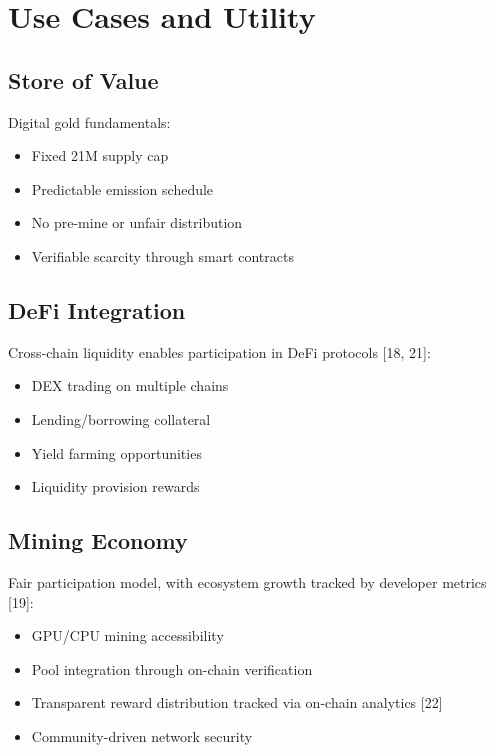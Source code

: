 \documentclass[11pt,a4paper]{article}
\begin{document}
\section{Use Cases and Utility}

\subsection{Store of Value}

Digital gold fundamentals:
\begin{itemize}
    \item Fixed 21M supply cap
    \item Predictable emission schedule
    \item No pre-mine or unfair distribution
    \item Verifiable scarcity through smart contracts
\end{itemize}

\subsection{DeFi Integration}

Cross-chain liquidity enables participation in DeFi protocols [18, 21]:
\begin{itemize}
    \item DEX trading on multiple chains
    \item Lending/borrowing collateral
    \item Yield farming opportunities
    \item Liquidity provision rewards
\end{itemize}

\subsection{Mining Economy}

Fair participation model, with ecosystem growth tracked by developer metrics [19]:
\begin{itemize}
    \item GPU/CPU mining accessibility
    \item Pool integration through on-chain verification
    \item Transparent reward distribution tracked via on-chain analytics [22]
    \item Community-driven network security
\end{itemize}
\end{document}
